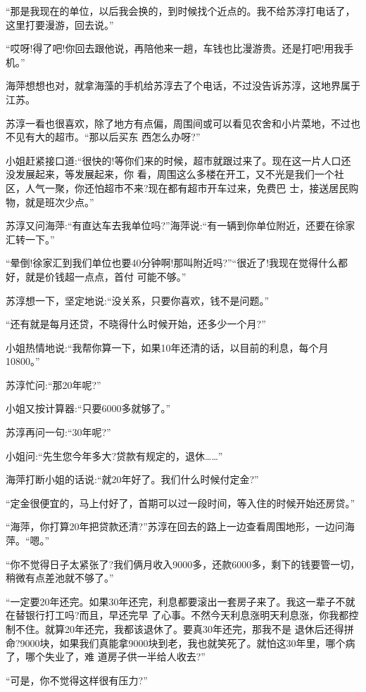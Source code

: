 \documentclass[11pt,a4paper,onecolumn]{article}
\begin{document}
``那是我现在的单位，以后我会换的，到时候找个近点的。我不给苏淳打电话了，这里打要漫游，回去说。''

``哎呀!得了吧!你回去跟他说，再陪他来一趟，车钱也比漫游贵。还是打吧!用我手机。''

海萍想想也对，就拿海藻的手机给苏淳去了个电话，不过没告诉苏淳，这地界属于江苏。

苏淳一看也很喜欢，除了地方有点偏，周围间或可以看见农舍和小片菜地，不过也不见有大的超市。``那以后买东
西怎么办呀?''

小姐赶紧接口道:``很快的!等你们来的时候，超市就跟过来了。现在这一片人口还没发展起来，等发展起来，你
看，周围这么多楼在开工，又不光是我们一个社区，人气一聚，你还怕超市不来?现在都有超市开车过来，免费巴
士，接送居民购物，就是班次少点。''

苏淳又问海萍:``有直达车去我单位吗?''海萍说:``有一辆到你单位附近，还要在徐家汇转一下。''

``晕倒!徐家汇到我们单位也要40分钟啊!那叫附近吗?''``很近了!我现在觉得什么都好，就是价钱超一点点，首付
可能不够。''

苏淳想一下，坚定地说:``没关系，只要你喜欢，钱不是问题。''

``还有就是每月还贷，不晓得什么时候开始，还多少一个月?''

小姐热情地说:``我帮你算一下，如果10年还清的话，以目前的利息，每个月10800。''

苏淳忙问:``那20年呢?''

小姐又按计算器:``只要6000多就够了。''

苏淳再问一句:``30年呢?''

小姐问:``先生您今年多大?贷款有规定的，退休……''

海萍打断小姐的话说:``就20年好了。我们什么时候付定金?''

``定金很便宜的，马上付好了，首期可以过一段时间，等入住的时候开始还房贷。''

``海萍，你打算20年把贷款还清?''苏淳在回去的路上一边查看周围地形，一边问海萍。``嗯。''

``你不觉得日子太紧张了?我们俩月收入9000多，还款6000多，剩下的钱要管一切，稍微有点差池就不够了。''

``一定要20年还完。如果30年还完，利息都要滚出一套房子来了。我这一辈子不就在替银行打工吗?而且，早还完早
了心事。不然今天利息涨明天利息涨，你我都控制不住。就算20年还完，我都该退休了。要真30年还完，那我不是
退休后还得拼命?9000块，如果我们真能拿9000块到老，我也就笑死了。就怕这30年里，哪个病了，哪个失业了，难
道房子供一半给人收去?''

``可是，你不觉得这样很有压力?''
\end{document}
